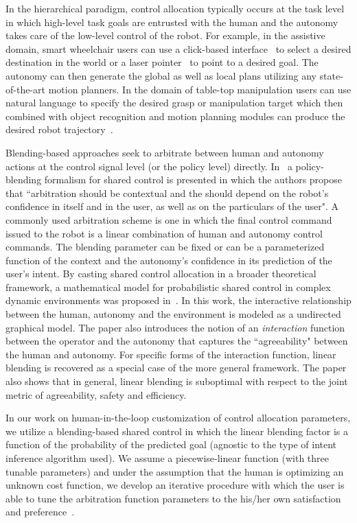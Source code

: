 \documentclass[12pt]{article}
\begin{document}
In the hierarchical paradigm, control allocation typically occurs at the task level in which high-level task goals are entrusted with the human and the autonomy takes care of the low-level control of the robot. For example, in the assistive domain, smart wheelchair users can use a click-based interface~\cite{simpson2008tooth} to select a desired destination in the world or a laser pointer~\cite{choi2008laser} to point to a desired goal. The autonomy can then generate the global as well as local plans utilizing any state-of-the-art motion planners. In the domain of table-top manipulation users can use natural language to specify the desired grasp or manipulation target which then combined with  object recognition and motion planning modules can produce the desired robot trajectory~\cite{broad2016towards}. 

Blending-based approaches seek to arbitrate between human and autonomy actions at the control signal level (or the policy level) directly. In~\cite{dragan2013policy} a policy-blending formalism for shared control is presented in which the authors propose that ``arbitration should be contextual and the should depend on the robot's confidence in itself and in the user, as well as on the particulars of the user". A commonly used arbitration scheme is one in which the final control command issued to the robot is a linear combination of human and autonomy control commands. The blending parameter can be fixed or can be a parameterized function of the context and the autonomy's confidence in its prediction of the user's intent.  By casting shared control allocation in a broader theoretical framework, a mathematical model for probabilistic shared control in complex dynamic environments was proposed in~\cite{trautman2015assistive}. In this work, the interactive relationship between the human, autonomy and the environment is modeled as a undirected graphical model. The paper also introduces the notion of an \textit{interaction} function between the operator and the autonomy that captures the ``agreeability" between the human and autonomy. For specific forms of the interaction function, linear blending is recovered as a special case of the more general framework. The paper also shows that in general, linear blending is suboptimal with respect to the joint metric of agreeability, safety and efficiency. 

In our work on human-in-the-loop customization of control allocation parameters, we utilize a blending-based shared control in which the linear blending factor is a function of the probability of the predicted goal (agnostic to the type of intent inference algorithm used). We assume a piecewise-linear function (with three tunable parameters) and under the assumption that the human is optimizing an unknown cost function, we develop an iterative procedure with which the user is able to tune the arbitration function parameters to the his/her own satisfaction and preference~\cite{gopinath2017human}.
\end{document}
